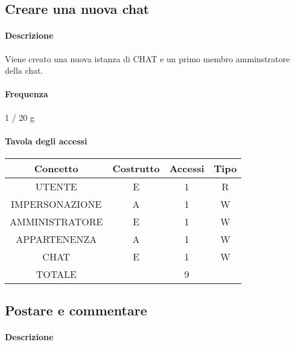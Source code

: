 \documentclass[a4paper,12pt]{report}
\begin{document}
\subsection{Creare una nuova chat} \label{nuova_chat}
\paragraph{Descrizione} Viene creato una nuova istanza di CHAT e un primo membro amminstratore della chat.
\paragraph{Frequenza} 1 / 20 g
\begin{table}[H]
\paragraph{Tavola degli accessi\newline}
\begin{tabular}{|c|c|c|c|}
\hline
Concetto       & Costrutto & Accessi & Tipo \\ \hline
UTENTE         & E         & 1       & R    \\ \hline
IMPERSONAZIONE & A         & 1       & W    \\ \hline
AMMINISTRATORE & E         & 1       & W    \\ \hline
APPARTENENZA   & A         & 1       & W    \\ \hline
CHAT           & E         & 1       & W    \\ \hline
TOTALE         &           & 9       &      \\ \hline
\end{tabular}
\end{table}
\subsection{Postare e commentare} \label{postare}
\paragraph{Descrizione}
\end{document}
